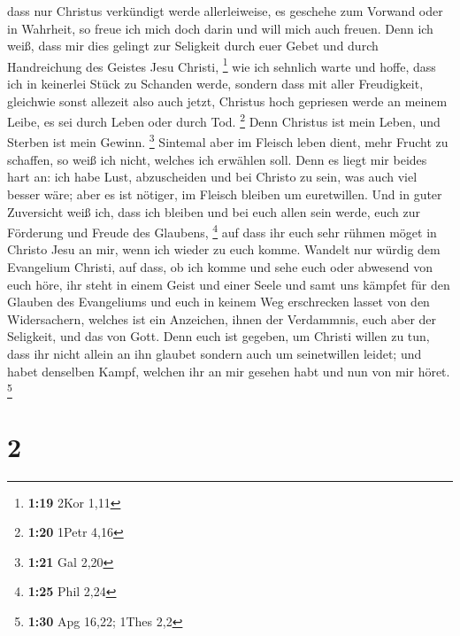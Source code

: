 dass nur Christus verkündigt werde allerleiweise, es geschehe zum
Vorwand oder in Wahrheit, so freue ich mich doch darin und will mich
auch freuen.  Denn ich weiß, dass mir dies gelingt zur
Seligkeit durch euer Gebet und durch Handreichung des Geistes Jesu
Christi, \footnote{\textbf{1:19} 2Kor 1,11}  wie ich
sehnlich warte und hoffe, dass ich in keinerlei Stück zu Schanden werde,
sondern dass mit aller Freudigkeit, gleichwie sonst allezeit also auch
jetzt, Christus hoch gepriesen werde an meinem Leibe, es sei durch Leben
oder durch Tod. \footnote{\textbf{1:20} 1Petr 4,16}  Denn
Christus ist mein Leben, und Sterben ist mein Gewinn. \footnote{\textbf{1:21}
  Gal 2,20}  Sintemal aber im Fleisch leben dient, mehr
Frucht zu schaffen, so weiß ich nicht, welches ich erwählen soll.
 Denn es liegt mir beides hart an: ich habe Lust,
abzuscheiden und bei Christo zu sein, was auch viel besser wäre;
 aber es ist nötiger, im Fleisch bleiben um euretwillen.
 Und in guter Zuversicht weiß ich, dass ich bleiben und bei
euch allen sein werde, euch zur Förderung und Freude des Glaubens,
\footnote{\textbf{1:25} Phil 2,24}  auf dass ihr euch sehr
rühmen möget in Christo Jesu an mir, wenn ich wieder zu euch komme.
 Wandelt nur würdig dem Evangelium Christi, auf dass, ob
ich komme und sehe euch oder abwesend von euch höre, ihr steht in einem
Geist und einer Seele und samt uns kämpfet für den Glauben des
Evangeliums  und euch in keinem Weg erschrecken lasset von
den Widersachern, welches ist ein Anzeichen, ihnen der Verdammnis, euch
aber der Seligkeit, und das von Gott.  Denn euch ist
gegeben, um Christi willen zu tun, dass ihr nicht allein an ihn glaubet
sondern auch um seinetwillen leidet;  und habet denselben
Kampf, welchen ihr an mir gesehen habt und nun von mir höret.
\footnote{\textbf{1:30} Apg 16,22; 1Thes 2,2}

\hypertarget{section-1}{%
\section{2}\label{section-1}}

